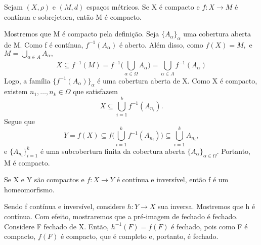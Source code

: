 \documentclass[metric_notes.tex]{subfiles}
\begin{document}
\begin{theorem*}
	Sejam \((X, \rho )\) e \((M, d)\) espaços métricos. Se X é compacto e \(f:X\rightarrow M\) é contínua e sobrejetora, então M é compacto.
\end{theorem*}
\begin{proof*}
	Mostremos que M é compacto pela definição. Seja \(\{A_{\alpha }\}_{\alpha }\) uma cobertura aberta de M. Como f é contínua,
	\(f^{-1}(A_{\alpha })\) é aberto. Além disso, como \(f(X) = M,\) e \(M = \bigcup_{\alpha \in A}^{}A_{\alpha },\)
	\[
		X \subseteq f^{-1}(M) = f^{-1}\biggl(\bigcup_{\alpha \in \Omega }^{}A_{\alpha }\biggr) = \bigcup_{\alpha \in A}^{}f^{-1}(A_{\alpha })
	\]
	Logo, a família \(\{f^{-1}(A_{\alpha })\}_{\alpha }\) é uma cobertura aberta de X. Como X é compacto, existem \(n_{1}, \dotsc, n_{k}\in \Omega \)
	que satisfazem
	\[
		X\subseteq \bigcup_{i=1}^{k}f^{-1}(A_{n_{i}}).
	\]
	Segue que
	\[
		Y = f(X)\subseteq f \biggl(\bigcup_{i=1}^{k}f^{-1}(A_{n_{i}})\biggr)\subseteq \bigcup_{i=1}^{k}A_{n_{i}},
	\]
	e \(\{A_{n_{i}}\}_{i=1}^{k}\) é uma subcobertura finita da cobertura aberta \(\{A_{\alpha }\}_{\alpha \in \Omega }\). Portanto,
	M é compacto. \qedsymbol
\end{proof*}
\begin{crl*}
	Se X e Y são compactos e \(f:X\rightarrow Y\) é contínua e inversível, então f é um homeomorfismo.
\end{crl*}
\begin{proof*}
	Sendo f contínua e inversível, considere \(h:Y\rightarrow X\) sua inversa. Mostremos que h é contínua.
	Com efeito, mostraremos que a pré-imagem de fechado é fechado. Considere F fechado de X. Então,
	\(h^{-1}(F) = f(F)\) é fechado, pois como F é compacto, \(f(F)\) é compacto, que é completo e, portanto, é fechado. \qedsymbol
\end{proof*}
\end{document}
